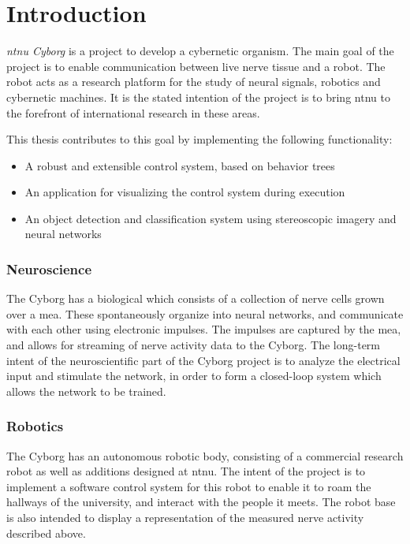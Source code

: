 \documentclass[\rootfolder/main.tex]{subfiles}
\begin{document}
\chapter{Introduction} %
\label{ch:introduction} %

\emph{\acrshort{ntnu} Cyborg} is a project to develop a cybernetic organism.
The main goal of the project is to enable communication between live nerve tissue and a robot.
The robot acts as a research platform for the study of neural signals, robotics and cybernetic machines.
It is the stated intention of the project is to bring \acrshort{ntnu} to the forefront of international research in these areas.

This thesis contributes to this goal by implementing the following functionality:

\begin{itemize}
    \item A robust and extensible control system, based on behavior trees
    \item An application for visualizing the control system during execution
    \item An object detection and classification system using stereoscopic imagery and neural networks
\end{itemize}

\subsection{Neuroscience}

The Cyborg has a biological  which consists of a collection of nerve cells grown over a \acrfull{mea}.
These spontaneously organize into neural networks, and communicate with each other using electronic impulses.
The impulses are captured by the \acrshort{mea}, and allows for streaming of nerve activity data to the Cyborg.
The long-term intent of the neuroscientific part of the Cyborg project is to analyze the electrical input and stimulate the network, in order to form a closed-loop system which allows the network to be trained.

\subsection{Robotics}

The Cyborg has an autonomous robotic body, consisting of a commercial research robot as well as additions designed at \acrshort{ntnu}.
The intent of the project is to implement a software control system for this robot to enable it to roam the hallways of the university, and interact with the people it meets.
The robot base is also intended to display a representation of the measured nerve activity described above.
\end{document}
